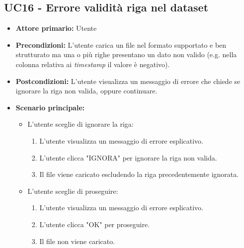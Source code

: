 \subsection{UC16 - Errore validità riga nel dataset}
\label{sec:UC16 - Errore validità riga}
\begin{itemize}
    \item \textbf{Attore primario:} Utente
    \item \textbf{Precondizioni:} L'utente carica un file nel formato supportato e ben strutturato ma una o più righe presentano un dato non valido (e.g. nella colonna relativa ai \textit{timestamp} il valore è negativo).  
    \item \textbf{Postcondizioni:} L'utente visualizza un messaggio di errore che chiede se ignorare la riga non valida, oppure continuare.
    \item \textbf{Scenario principale:}
    \begin{itemize}
        \item   L'utente sceglie di ignorare la riga:
                \begin{enumerate}
                    \item L'utente visualizza un messaggio di errore esplicativo.
                    \item L'utente clicca "IGNORA" per ignorare la riga non valida.
                    \item Il file viene caricato escludendo la riga precedentemente ignorata.
                \end{enumerate} 
        \item   L'utente sceglie di proseguire:
                \begin{enumerate}
                    \item L'utente visualizza un messaggio di errore esplicativo.
                    \item L'utente clicca "OK" per proseguire.
                    \item Il file non viene caricato.
                \end{enumerate} 
    \end{itemize}
\end{itemize}

